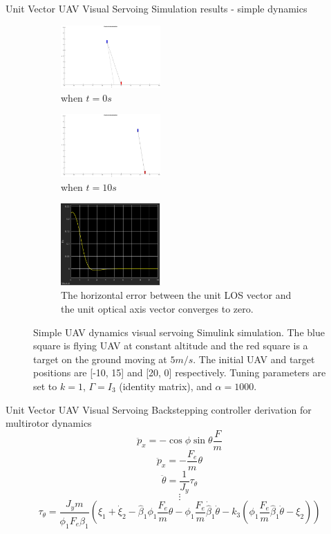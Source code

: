 \documentclass[9pt]{beamer}
\begin{document}
\begin{frame}{Unit Vector UAV Visual Servoing}
Simulation results - simple dynamics
\begin{figure}[htbp]
	\centering
	\begin{subfigure}[t]{0.32\linewidth}
		\includegraphics[width=1.5in]{chapter4/simple_zero}
		\caption{when $t=0s$}
	\end{subfigure}
	\begin{subfigure}[t]{0.32\linewidth}
		\includegraphics[width=1.5in]{chapter4/simple_ten}
		\caption{when $t=10s$}
	\end{subfigure}
	\begin{subfigure}[t]{0.32\linewidth}
		\centering
		\includegraphics[width=1.5in]{chapter4/simple_ex}
		\caption{The horizontal error between the unit LOS vector and the unit optical axis vector converges to zero.}
	\end{subfigure}	
	\caption{Simple UAV dynamics visual servoing Simulink simulation. The blue square is flying UAV at constant altitude and the red square is a target on the ground moving at $5m/s$. The initial UAV and target positions are [-10, 15] and [20, 0] respectively. Tuning parameters are set to $k=1$, $\Gamma=I_3$ (identity matrix), and $\alpha=1000$.}
	\label{simple_simulation}
\end{figure}
\end{frame}

\begin{frame}{Unit Vector UAV Visual Servoing}
Backstepping controller derivation for multirotor dynamics
\begin{equation}
\ddot{p}_x=-\cos\phi\sin\theta\frac{F}{m}
\end{equation}
\begin{equation}
\ddot{p}_x=-\frac{F_e}{m}\theta
\end{equation}
\begin{equation}
\ddot{\theta}=\frac{1}{J_y}\tau_{\theta}
\end{equation}
$$\vdots$$
\begin{equation}
\tau_\theta=\frac{J_ym}{\phi_1F_e\hat{\beta}_1}
(\xi_1+\dot{\xi}_2-\hat{\beta}_1\phi_1\frac{F_e}{m}\theta-\phi_1\frac{F_e}{m}\dot{\hat{\beta}}_1\dot{\theta}-k_3(\phi_1\frac{F_e}{m}\hat{\beta}_1\dot{\theta}-\xi_2))
\end{equation}
\end{frame}
\end{document}

